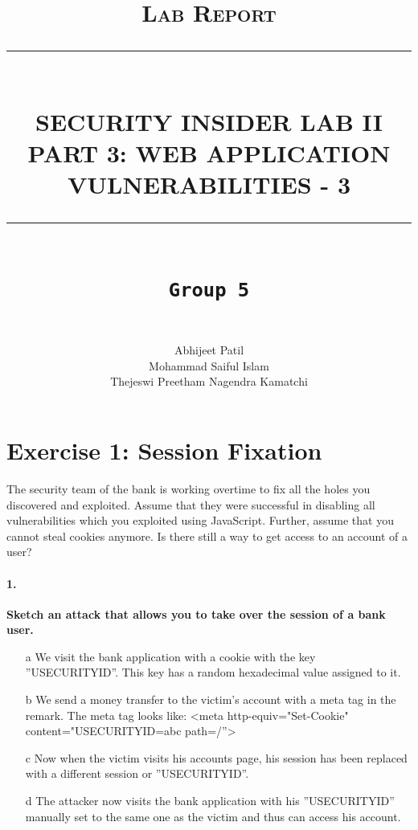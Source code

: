 \documentclass[12pt]{report}
\newcommand{\HRule}[1]{\rule{\linewidth}{#1}}
\begin{document}
	
	\title{ \normalsize \textsc{Lab Report}
		\\ [2.0cm]
		\HRule{0.5pt} \\
		\LARGE \textbf{\uppercase{Security Insider Lab II \\
				Part 3: Web Application Vulnerabilities - 3}}
		\HRule{2pt} \\ [0.5cm]
		\normalsize \vspace*{4\baselineskip}
		\LARGE {\tt Group 5}\\}
	\date{}
	\author{
		\\
		Abhijeet Patil \\
		Mohammad Saiful Islam\\
		Thejeswi Preetham Nagendra Kamatchi}
	\maketitle
	\newpage
	
	\section*{Exercise 1: Session Fixation}
	The security team of the bank is working overtime to fix all the holes you discovered and exploited. Assume
	that they were successful in disabling all vulnerabilities which you exploited using JavaScript. Further, assume
	that you cannot steal cookies anymore. Is there still a way to get access to an account of a user?
	
	\paragraph*{1.}{\bf Sketch an attack that allows you to take over the session of a bank user.}\\
	\begin{itemize}
		
		\item[a] We visit the bank application with a cookie with the key ''USECURITYID''. This key has a random hexadecimal value assigned to it.
		\item[b] We send a money transfer to the victim's account with a meta tag in the remark. The meta tag looks like: <meta http-equiv="Set-Cookie" content="USECURITYID=abc path=/''>
		\item[c] Now when the victim visits his accounts page, his session has been replaced with a different session or ''USECURITYID''.
		\item[d] The attacker now visits the bank application with his ''USECURITYID'' manually set to the same one as the victim and thus can access his account.
	\end{itemize}
	
\end{document}
